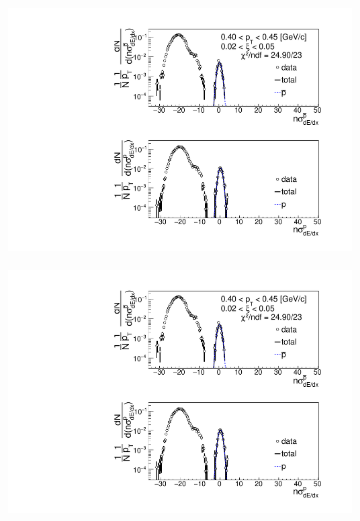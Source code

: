 \begin{figure}[h!]
\begin{subfigure}{.32\textwidth}
	\end{subfigure}
	\begin{subfigure}{.32\textwidth}
		\includegraphics[width=\linewidth, page=4]{chapters/chrgSTAR/img/dEdx/fit2019_thirdStep_2_0.pdf}
	\end{subfigure}
	\begin{subfigure}{.32\textwidth}
		\includegraphics[width=\linewidth, page=5]{chapters/chrgSTAR/img/dEdx/fit2019_thirdStep_2_0.pdf}
	\end{subfigure}
	\begin{subfigure}{.32\textwidth}

\end{subfigure}
\end{figure}

